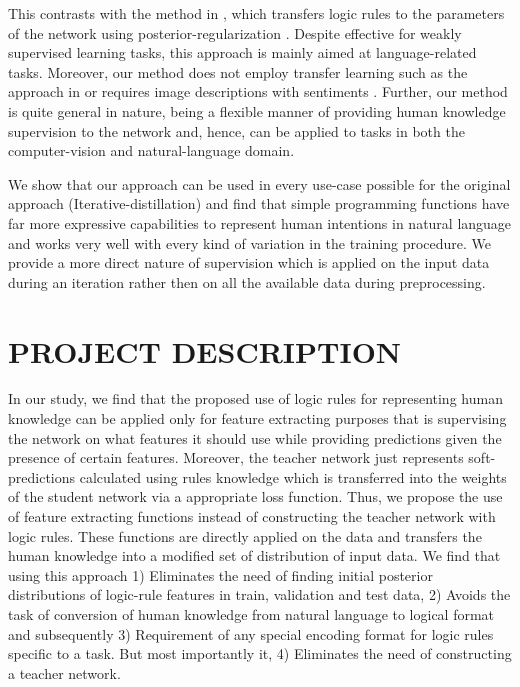 \documentclass[12pt,a4paper]{article}
\begin{document}
This contrasts with the method in \cite{Hu:2019}, which transfers logic rules to the parameters of the network using posterior-regularization \cite{Ganchev:2010}. Despite effective for weakly supervised learning tasks, this approach is mainly aimed at language-related tasks. Moreover, our method does not employ transfer learning such as the approach in \cite{You:2015} or requires image descriptions with sentiments \cite{Mathews:2016}. Further, our method is quite general in nature, being a  flexible manner of providing human knowledge supervision to the network and, hence, can be applied to tasks in both the computer-vision and natural-language domain.
\vspace{2 mm}

We show that our approach can be used in every use-case possible for the original approach (Iterative-distillation)
and find that simple programming functions have far more
expressive capabilities to represent human intentions in natural
language and works very well with every kind of variation in
the training procedure. We provide a more direct nature of supervision which is applied on the input data during an iteration
rather then on all the available data during preprocessing.
\vspace{2mm}

\newpage
\section{\uppercase{Project Description}}
\label{sct:02}
In our study, we find that the proposed use of logic rules
for representing human knowledge can be applied only for
feature extracting purposes that is supervising the network
on what features it should use while providing predictions
given the presence of certain features. Moreover, the teacher
network just represents soft-predictions calculated using rules
knowledge which is transferred into the weights of the student
network via a appropriate loss function. Thus, we propose the
use of feature extracting functions instead of constructing the
teacher network with logic rules. These functions are directly
applied on the data and transfers the human knowledge into a
modified set of distribution of input data. We find that using
this approach 1) Eliminates the need of finding initial posterior
distributions of logic-rule features in train, validation and test
data, 2) Avoids the task of conversion of human knowledge
from natural language to logical format and subsequently 3)
Requirement of any special encoding format for logic rules
specific to a task. But most importantly it, 4) Eliminates the
need of constructing a teacher network.
\end{document}
